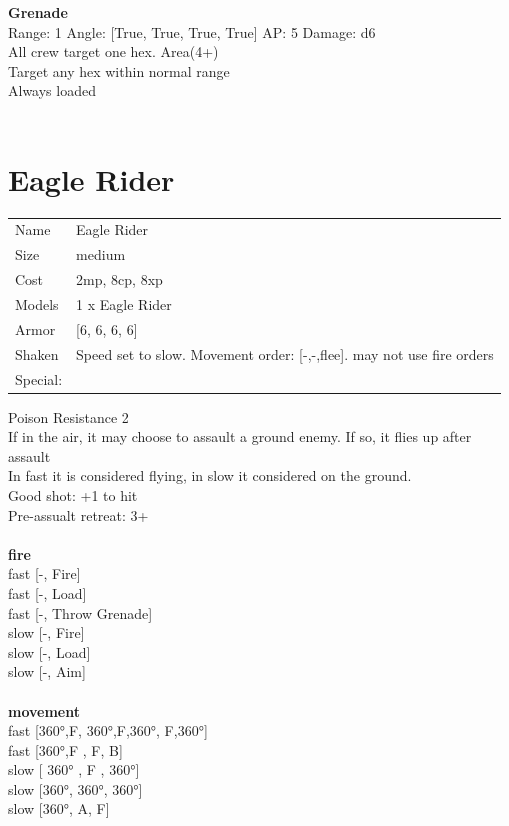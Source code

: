 {\bf Grenade } \\



Range: 1  Angle: [True, True, True, True] AP: 5 Damage: d6 \\
All crew target one hex. Area(4+)\\ 
Target any hex within normal range\\ 
Always loaded\\ 




 
\ \\













\clearpage

\section{ Eagle Rider }

\begin{tabular}{ll}
  Name & Eagle Rider \\
  Size & medium\\
  Cost & 2mp, 8cp, 8xp\\
  Models & 1 x Eagle Rider\\
  Armor & [6, 6, 6, 6]\\
  Shaken & Speed set to slow. Movement order: [-,-,flee]. may not use fire orders\\
  Special: \\
\end{tabular}

\noindent Poison Resistance 2\\ 
If in the air, it may choose to assault a ground enemy. If so, it flies up after assault\\ 
In fast it is considered flying, in slow it considered on the ground.\\ 
Good shot: +1 to hit\\ 
Pre-assualt retreat: 3+\\ 


\ \\ {\bf fire } \\
fast [-, Fire] \\
fast [-, Load] \\
fast [-, Throw Grenade] \\
slow [-, Fire] \\
slow [-, Load] \\
slow [-, Aim] \\
\ \\ {\bf movement } \\
fast [360°,F, 360°,F,360°, F,360°] \\
fast [360°,F , F, B] \\
slow [ 360° ,  F ,  360°] \\
slow [360°, 360°, 360°] \\
slow [360°, A, F] \\


